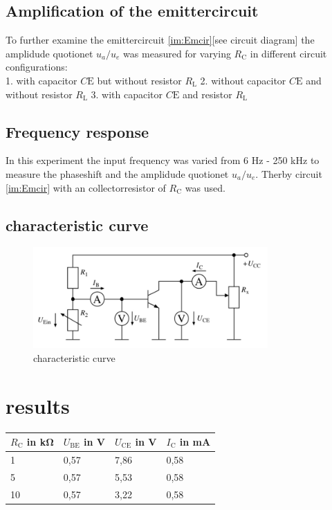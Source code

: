 \documentclass[11pt, a4paper]{article}
\begin{document}
\subsection{Amplification of the emittercircuit}
To further examine the emittercircuit \ref{im:Emcir}[see circuit diagram] the amplidude quotionet $u_a / u_e$ was measured for varying $R_{\text{C}}$ in different circuit configurations:\\
1. with capacitor $C{\text{E}}$ but without resistor $R_{\text{L}}$
2. without capacitor $C{\text{E}}$ and without resistor $R_{\text{L}}$
3. with capacitor $C{\text{E}}$ and resistor $R_{\text{L}}$
\subsection{Frequency response}
In this experiment the input frequency was varied from 6 \si{\hertz} - 250 \si{\kilo\hertz} to measure the phaseshift and the amplidude quotionet $u_a / u_e$. 
Therby circuit \ref{im:Emcir} with an collectorresistor of $R_{\text{C}}$ was used.
\subsection{characteristic curve}
\begin{figure}[h]
    \centering
    \includegraphics[width=0.8\textwidth]{bilder/characteristicCurve.png}
    \caption{characteristic curve}
    \label{im:Charcurcir}
\end{figure}

\section{results}

\begin{table}[!ht]
    \centering
    \begin{tabular}{l|l|l|l}
    
        $R_{\text{C}}$ in \si{\kilo\ohm}  & $U_{\text{BE}}$ in \si{\volt} & $U_{\text{CE}}$ in \si{\volt} & $I_{\text{C}}$ in \si{\milli\ampere}  \\ \hline
        1 & 0,57 & 7,86 & 0,58 \\ \hline
        5 & 0,57 & 5,53 & 0,58 \\ \hline
        10 & 0,57 & 3,22 & 0,58 \\ 
    \end{tabular}
\end{table}




\end{document}
